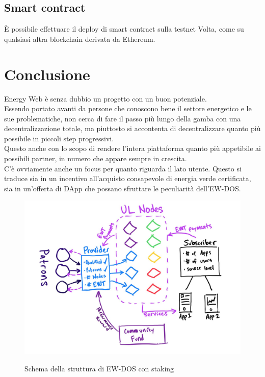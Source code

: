 \documentclass[12pt, letterpaper, twoside]{article}
\begin{document}
\subsection{Smart contract}
È possibile effettuare il deploy di smart contract sulla testnet Volta, come su qualsiasi altra blockchain derivata da Ethereum.

\newpage

\section{Conclusione}
Energy Web è senza dubbio un progetto con un buon potenziale. \\
Essendo portato avanti da persone che conoscono bene il settore energetico e le sue problematiche, non cerca di fare il passo più lungo della gamba con una decentralizzazione totale, ma piuttosto si accontenta di decentralizzare quanto più possibile in piccoli step progressivi. \\
Questo anche con lo scopo di rendere l'intera piattaforma quanto più appetibile ai possibili partner, in numero che appare sempre in crescita. \\
C'è ovviamente anche un focus per quanto riguarda il lato utente.
Questo si traduce sia in un incentivo all'acquisto consapevole di energia verde certificata, sia in un'offerta di DApp che possano sfruttare le peculiarità dell'EW-DOS.

\begin{figure}[h]
    \includegraphics[width=13cm]{ew-staking}
    \centering
    \label{ew-staking}
    \caption{Schema della struttura di EW-DOS con staking \cite{art:ew-staking}}
\end{figure}

\newpage

\printbibliography
\end{document}
